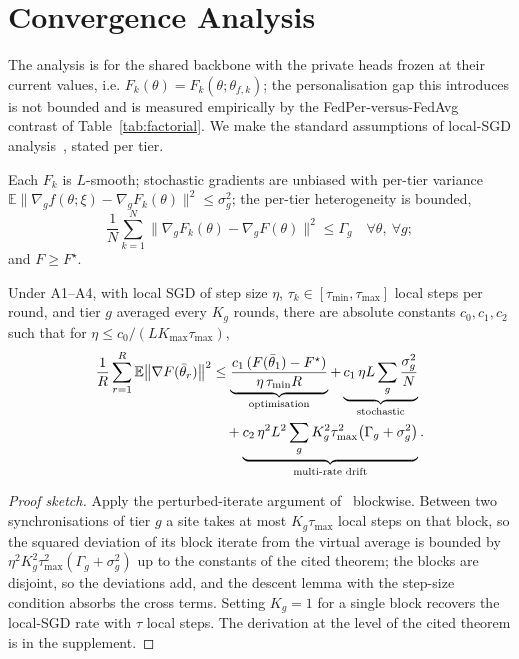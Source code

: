 \section{Convergence Analysis}
\label{sec:analysis}

The analysis is for the shared backbone with the private heads frozen at their current values, i.e. $F_k(\theta)=F_k(\theta;\theta_{f,k})$; the personalisation gap this introduces is not bounded and is measured empirically by the FedPer-versus-FedAvg contrast of Table~\ref{tab:factorial}. We make the standard assumptions of local-SGD analysis~\cite{stich2019,wang2021coop}, stated per tier.

\begin{assumption}[A1--A4]
Each $F_k$ is $L$-smooth; stochastic gradients are unbiased with per-tier variance $\mathbb E\|\nabla_g f(\theta;\xi)-\nabla_g F_k(\theta)\|^2\le\sigma_g^2$; the per-tier heterogeneity is bounded,
\begin{equation}
\frac1N\sum_{k=1}^N\big\|\nabla_gF_k(\theta)-\nabla_gF(\theta)\big\|^2\le\Gamma_g\quad\forall\theta,\ \forall g;
\label{eq:a3}
\end{equation}
and $F\ge F^\star$.
\end{assumption}

\begin{proposition}
\label{prop:bound}
Under A1--A4, with local SGD of step size $\eta$, $\tau_k\in[\tau_{\min},\tau_{\max}]$ local steps per round, and tier $g$ averaged every $K_g$ rounds, there are absolute constants $c_0,c_1,c_2$ such that for $\eta\le c_0/(LK_{\max}\tau_{\max})$,
\begin{align}
\frac1R\sum_{r=1}^R\mathbb E\big\|\nabla F(\bar\theta_r)\big\|^2
&\le \underbrace{\frac{c_1\,(F(\bar\theta_1)-F^\star)}{\eta\,\tau_{\min}R}}_{\text{optimisation}}
+\underbrace{c_1\,\eta L\sum_g\frac{\sigma_g^2}{N}}_{\text{stochastic}}\notag\\
&\quad+\underbrace{c_2\,\eta^2L^2\sum_g K_g^2\tau_{\max}^2\big(\Gamma_g+\sigma_g^2\big)}_{\text{multi-rate drift}} .
\label{eq:bound}
\end{align}
\end{proposition}

\begin{proof}[Proof sketch]
Apply the perturbed-iterate argument of~\cite{wang2021coop} blockwise. Between two synchronisations of tier $g$ a site takes at most $K_g\tau_{\max}$ local steps on that block, so the squared deviation of its block iterate from the virtual average is bounded by $\eta^2K_g^2\tau_{\max}^2(\Gamma_g+\sigma_g^2)$ up to the constants of the cited theorem; the blocks are disjoint, so the deviations add, and the descent lemma with the step-size condition absorbs the cross terms. Setting $K_g=1$ for a single block recovers the local-SGD rate with $\tau$ local steps. The derivation at the level of the cited theorem is in the supplement.
\end{proof}

